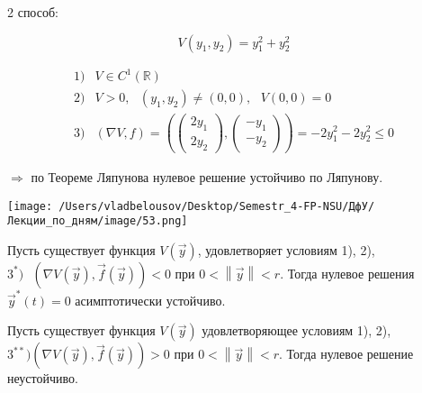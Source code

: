 \documentclass[12pt, a4paper]{report}
\begin{document}
2 способ: 

\[ V (y_1 , y_2 ) = y_1 ^2 + y_2 ^2  \] 

\[ \begin{aligned}
    1)& V \in  C^1 (\mathbb{R}) \\
    2)& V > 0 , \text{ }  (y_1,y_2 ) \neq (0,0 ) , \text{ }  V (0,0 ) = 0  \\
    3)& (\nabla V , f) = \left( \begin{pmatrix}
        2y_1    \\
        2y_2
        \end{pmatrix} , \begin{pmatrix}
        -y_1\\
        -y_2
        \end{pmatrix} \right)  = -2 y_1 ^2 - 2y_2 ^2 \le  0
\end{aligned} \] 

\( \Rightarrow \)  по Теореме Ляпунова нулевое решение устойчиво по Ляпунову.

\begin{center}
    \texttt{[image: /Users/vladbelousov/Desktop/Semestr\_4-FP-NSU/ДфУ/Лекции\_по\_дням/image/53.png]}
\end{center}

\begin{theorem}
    Пусть существует функция \( V(\vec{y} ) \), удовлетворяет условиям 1), 2), \( 3^*)  \text{ }  (\nabla V(\vec{y} ), \vec{f } (\vec{y } ))< 0\) при \( 0 < \left\lVert \vec{y }  \right\rVert < r \). Тогда нулевое решения \( \vec{y } ^* (t) =0  \) асимптотически устойчиво.
\end{theorem}

\begin{theorem}
    Пусть существует функция \( V(\vec{y} ) \) удовлетворяющее условиям 1), 2), \( 3^{**}) (\nabla V(\vec{y } ) , \vec{f } ( \vec{y } )) > 0  \) при \( 0 < \left\lVert  \vec{y }  \right\rVert < r \). Тогда нулевое  решение неустойчиво.
\end{theorem}

\ifdefined\mainfile
\else
    
\end{document}
